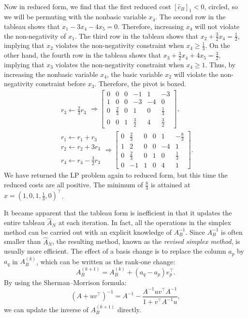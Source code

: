 \begin{example}
\begin{align*}
\end{align*}
Now in reduced form, we find that the first reduced cost $[\hat{c}_B]_1<0$, circled, so we will be permuting with the nonbasic variable $x_4$. The second row in the tableau shows that $x_1 -3x_4 - 4x_5=0$. Therefore, increasing $x_4$ will not violate the non-negativity of $x_1$. The third row in the tableau shows that $x_2+\tfrac{3}{2}x_4 = \tfrac{1}{2}$, implying that $x_2$ violates the non-negativity constraint when $x_4\ge\tfrac{1}{3}$. On the other hand, the fourth row in the tableau shows that $x_3+\tfrac{3}{2}x_4+4x_5 = \tfrac{3}{2}$, implying that $x_3$ violates the non-negativity constraint when $x_4\ge1$. Thus, by increasing the nonbasic variable $x_4$, the basic variable $x_2$ will violate the non-negativity constraint before $x_3$. Therefore, the pivot is boxed.
\begin{align*}
\begin{array}{c} ~\\r_3 \leftarrow \tfrac{2}{3}r_3\end{array} \Rightarrow \left[\begin{array}{ccccc|c} 0 & 0 & 0 & -1 & 1 & -3\\\hline 1 & 0 & 0 & -3 & -4 & 0\\ 0 & \tfrac{2}{3} & 0 & 1 & 0 & \tfrac{1}{3}\\ 0 & 0 & 1 & \tfrac{3}{2} & 4 & \tfrac{3}{2}\end{array}\right],\\
\begin{array}{c} r_1\leftarrow r_1+r_3\\r_2\leftarrow r_2 + 3r_3\\~\\r_4\leftarrow r_4-\tfrac{3}{2}r_3\end{array} \Rightarrow \left[\begin{array}{ccccc|c} 0 & \tfrac{2}{3} & 0 & 0 & 1 & -\tfrac{8}{3}\\\hline 1 & 2 & 0 & 0 & -4 & 1\\ 0 & \tfrac{2}{3} & 0 & 1 & 0 & \tfrac{1}{3}\\ 0 & -1 & 1 & 0 & 4 & 1\end{array}\right].
\end{align*}
We have returned the LP problem again to reduced form, but this time the reduced costs are all positive. The minimum of $\tfrac{8}{3}$ is attained at $x = (1,0,1,\tfrac{1}{3},0)^\top$.
\end{example}

It became apparent that the tableau form is inefficient in that it updates the entire tableau $\hat{A}_N$ at each iteration. In fact, all the operations in the simplex method can be carried out with an explicit knowledge of $A_B^{-1}$. Since $A_B^{-1}$ is often smaller than $\hat{A}_N$, the resulting method, known as the {\em revised simplex method}, is usually more efficient. The effect of a basis change is to replace the column $a_p$ by $a_q$ in $A_B^{(k)}$, which can be written as the rank-one change:
\[
A_B^{(k+1)} = A_B^{(k)} + (a_q-a_p)e_p^\top.
\]
By using the Sherman--Morrison formula:
\[
\left(A+uv^\top\right)^{-1} = A^{-1} - \dfrac{A^{-1}uv^\top A^{-1}}{1+v^\top A^{-1}u},
\]
we can update the inverse of $A_B^{(k+1)}$ directly.

